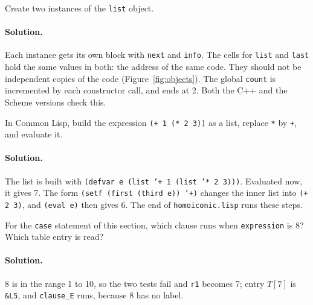 \begin{exercise}
Create two instances of the \texttt{list} object.
\end{exercise}

\paragraph{Solution.} Each instance gets its own block with \texttt{next} and
\texttt{info}. The cells for \texttt{list} and \texttt{last} hold the same
values in both: the address of the same code. They should not be independent
copies of the code (Figure~\ref{fig:objects}). The global \texttt{count} is
incremented by each constructor call, and ends at 2. Both the C++ and the
Scheme versions check this.

\begin{exercise}
In Common Lisp, build the expression \texttt{(+ 1 (* 2 3))} as a list, replace
\texttt{*} by \texttt{+}, and evaluate it.
\end{exercise}

\paragraph{Solution.} The list is built with
\texttt{(defvar e (list '+ 1 (list '* 2 3)))}. Evaluated now, it gives 7. The
form \texttt{(setf (first (third e)) '+)} changes the inner list into
\texttt{(+ 2 3)}, and \texttt{(eval e)} then gives 6. The end of
\texttt{homoiconic.lisp} runs these steps.

\begin{exercise}
For the \texttt{case} statement of this section, which clause runs when
\texttt{expression} is 8? Which table entry is read?
\end{exercise}

\paragraph{Solution.} 8 is in the range 1 to 10, so the two tests fail and
\texttt{r1} becomes 7; entry $T[7]$ is \texttt{\&L5}, and \texttt{clause\_E} runs,
because 8 has no label.
